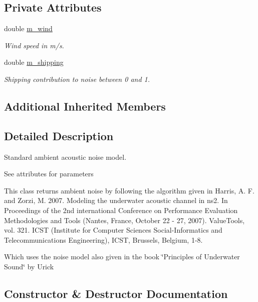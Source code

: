 \subsection*{Private Attributes}
\begin{DoxyCompactItemize}
\item 
double \hyperlink{classns3_1_1UanNoiseModelDefault_a19160cf4ca2de1e498a25023336ad998}{m\+\_\+wind}
\begin{DoxyCompactList}\small\item\em Wind speed in m/s. \end{DoxyCompactList}\item 
double \hyperlink{classns3_1_1UanNoiseModelDefault_af04dd65db85045907b790b1e2dac9e4e}{m\+\_\+shipping}
\begin{DoxyCompactList}\small\item\em Shipping contribution to noise between 0 and 1. \end{DoxyCompactList}\end{DoxyCompactItemize}
\subsection*{Additional Inherited Members}


\subsection{Detailed Description}
Standard ambient acoustic noise model.

See attributes for parameters

This class returns ambient noise by following the algorithm given in Harris, A. F. and Zorzi, M. 2007. Modeling the underwater acoustic channel in ns2. In Proceedings of the 2nd international Conference on Performance Evaluation Methodologies and Tools (Nantes, France, October 22 -\/ 27, 2007). Value\+Tools, vol. 321. I\+C\+ST (Institute for Computer Sciences Social-\/\+Informatics and Telecommunications Engineering), I\+C\+ST, Brussels, Belgium, 1-\/8.

Which uses the noise model also given in the book \char`\"{}\+Principles of Underwater Sound\char`\"{} by Urick 

\subsection{Constructor \& Destructor Documentation}
